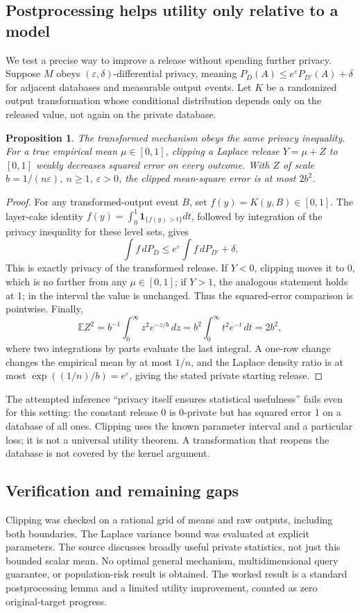 \documentclass[11pt]{article}
\newtheorem{proposition}{Proposition}
\begin{document}
\subsection{Postprocessing helps utility only relative to a model}
We test a precise way to improve a release without spending further privacy. Suppose $M$ obeys $(\varepsilon,\delta)$-differential privacy, meaning $P_D(A)\le e^\varepsilon P_{D'}(A)+\delta$ for adjacent databases and measurable output events. Let $K$ be a randomized output transformation whose conditional distribution depends only on the released value, not again on the private database.
\begin{proposition}
The transformed mechanism obeys the same privacy inequality. For a true empirical mean $\mu\in[0,1]$, clipping a Laplace release $Y=\mu+Z$ to $[0,1]$ weakly decreases squared error on every outcome. With $Z$ of scale $b=1/(n\varepsilon)$, $n\ge1$, $\varepsilon>0$, the clipped mean-square error is at most $2b^2$.
\end{proposition}
\begin{proof}
For any transformed-output event $B$, set $f(y)=K(y,B)\in[0,1]$. The layer-cake identity $f(y)=\int_0^1\mathbf1_{\{f(y)>t\}}dt$, followed by integration of the privacy inequality for these level sets, gives
\[
\int f\,dP_D\le e^\varepsilon\int f\,dP_{D'}+\delta.
\]
This is exactly privacy of the transformed release. If $Y<0$, clipping moves it to 0, which is no farther from any $\mu\in[0,1]$; if $Y>1$, the analogous statement holds at 1; in the interval the value is unchanged. Thus the squared-error comparison is pointwise. Finally,
\[
\mathbb E Z^2=b^{-1}\int_0^\infty z^2e^{-z/b}\,dz
=b^2\int_0^\infty t^2e^{-t}\,dt=2b^2,
\]
where two integrations by parts evaluate the last integral. A one-row change changes the empirical mean by at most $1/n$, and the Laplace density ratio is at most $\exp((1/n)/b)=e^\varepsilon$, giving the stated private starting release.
\end{proof}
The attempted inference ``privacy itself ensures statistical usefulness'' fails even for this setting: the constant release 0 is 0-private but has squared error 1 on a database of all ones. Clipping uses the known parameter interval and a particular loss; it is not a universal utility theorem. A transformation that reopens the database is not covered by the kernel argument.
\subsection{Verification and remaining gaps}
Clipping was checked on a rational grid of means and raw outputs, including both boundaries. The Laplace variance bound was evaluated at explicit parameters. The source discusses broadly useful private statistics, not just this bounded scalar mean. No optimal general mechanism, multidimensional query guarantee, or population-risk result is obtained. The worked result is a standard postprocessing lemma and a limited utility improvement, counted as zero original-target progress.
\end{document}
